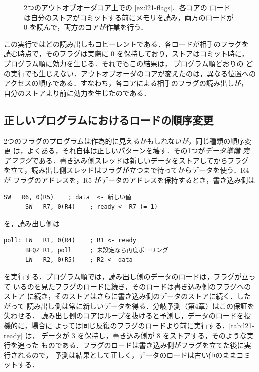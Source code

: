 \documentclass[../main.tex]{subfiles}
\begin{document}
\begin{figure}[htbp]
  \centering
  
  \caption{2つのアウトオブオーダコア上での \cref{ex:l21-flags}．各コアの
    ロードは自分のストアがコミットする前にメモリを読み，両方のロードが 0
    を読んで，両方のコアが作業を行う．}
  \label{fig:l21-reorder}
\end{figure}

この実行ではどの読み出しもコヒーレントである．各ロードが相手のフラグを
読む時点で，そのフラグは実際に 0 を保持しており，ストアはコミット時に，
プログラム順に効力を生じる．それでもこの結果は，
プログラム順どおりの
どの実行でも生じえない．アウトオブオーダのコアが変えたのは，異なる位置への
アクセスの順序である．すなわち，各コアによる相手のフラグの読み出しが，
自分のストアより前に効力を生じたのである．

\subsection{正しいプログラムにおけるロードの順序変更}
\label{sec:l21-ready}

2つのフラグのプログラムは作為的に見えるかもしれないが，同じ種類の順序変更
は，よくある，それ自体は正しいパターンを壊す．その1つが\emph{データ準備
完了フラグ}である．書き込み側スレッドは新しいデータをストアしてからフラグ
を立て，読み出し側スレッドはフラグが立つまで待ってからデータを使う．R4 が
フラグのアドレスを，R5 がデータのアドレスを保持するとき，書き込み側は
\begin{lstlisting}[language={[x86masm]Assembler}, numbers=none]
      SW   R6, 0(R5)    ; data  <- 新しい値
      SW   R7, 0(R4)    ; ready <- R7 (= 1)
\end{lstlisting}
を，読み出し側は
\begin{lstlisting}[language={[x86masm]Assembler}, numbers=none]
poll: LW   R1, 0(R4)    ; R1 <- ready
      BEQZ R1, poll     ; 未設定なら再度ポーリング
      LW   R2, 0(R5)    ; R2 <- data
\end{lstlisting}
を実行する．プログラム順では，読み出し側のデータのロードは，フラグが立って
いるのを見たフラグのロードに続き，そのロードは書き込み側のフラグへのストア
に続き，そのストアはさらに書き込み側のデータのストアに続く．したがって
読み出し側は常に新しいデータを得る．分岐予測（第4章）はこの保証を失わせる．
読み出し側のコアはループを抜けると予測し，データのロードを投機的に，場合に
よっては同じ反復のフラグのロードより前に実行する．\cref{tab:l21-ready} は，
データが 3 を保持し，書き込み側が 8 をストアする，そのような実行を追った
ものである．フラグのロードは書き込み側がフラグを立てた後に実行されるので，
予測は結果として正しく，データのロードは古い値のままコミットする．
\end{document}
